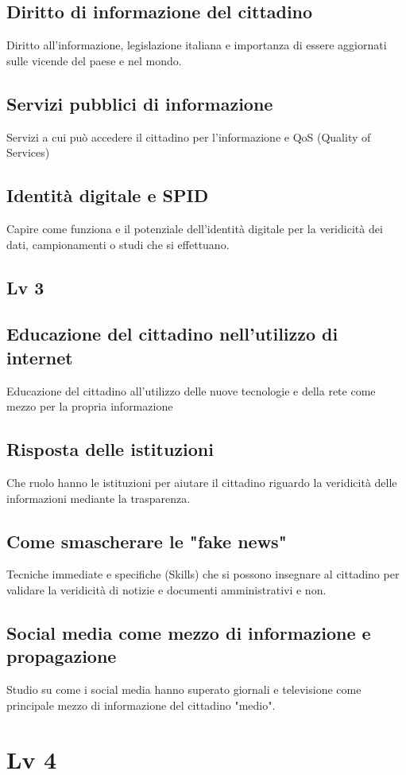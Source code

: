\documentclass{article}
\begin{document}
\subsection{Diritto di informazione del cittadino}
Diritto all'informazione, legislazione italiana e importanza di essere aggiornati sulle vicende del paese e nel mondo.
\subsection{Servizi pubblici di informazione}
Servizi a cui può accedere il cittadino per l'informazione e QoS (Quality of Services)
\subsection{Identità digitale e SPID}
Capire come funziona e il potenziale dell'identità digitale per la veridicità dei dati, campionamenti o studi che si effettuano.
\subsection{Lv 3}
\subsection{Educazione del cittadino nell'utilizzo di internet}
Educazione del cittadino all'utilizzo delle nuove tecnologie e della rete come mezzo per la propria informazione
\subsection{Risposta delle istituzioni}
Che ruolo hanno le istituzioni per aiutare il cittadino riguardo la veridicità delle informazioni mediante la trasparenza.
\subsection{Come smascherare le "fake news"}
Tecniche immediate e specifiche (Skills) che si possono insegnare al cittadino per validare la veridicità di notizie e documenti amministrativi e non.
\subsection{Social media come mezzo di informazione e propagazione}
Studio su come i social media hanno superato giornali e televisione come principale mezzo di informazione del cittadino "medio".
\section{Lv 4}
\end{document}
